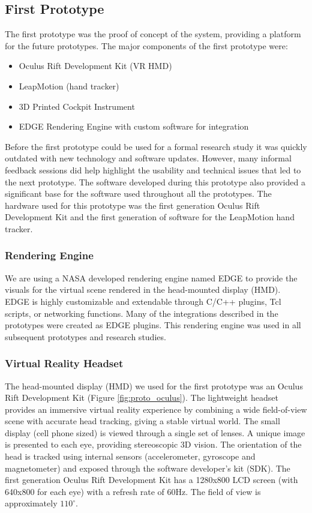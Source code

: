 \subsection{First Prototype}

The first prototype was the proof of concept of the system, providing a platform for the future prototypes.
The major components of the first prototype were:
\begin{itemize}
    \item Oculus Rift Development Kit (VR HMD)
    \item LeapMotion (hand tracker)
    \item 3D Printed Cockpit Instrument
    \item EDGE Rendering Engine with custom software for integration
\end{itemize}

Before the first prototype could be used for a formal research study it was quickly outdated with new technology and software updates.
However, many informal feedback sessions did help highlight the usability and technical issues that led to the next prototype.
The software developed during this prototype also provided a significant base for the software used throughout all the prototypes.
The hardware used for this prototype was the first generation Oculus Rift Development Kit and the first generation of software for the LeapMotion hand tracker.

\subsubsection{Rendering Engine}

We are using a NASA developed rendering engine named EDGE to provide the visuals for the virtual scene rendered in the head-mounted display (HMD).
EDGE is highly customizable and extendable through C/C++ plugins, Tcl scripts, or networking functions.
Many of the integrations described in the prototypes were created as EDGE plugins.
This rendering engine was used in all subsequent prototypes and research studies.

\subsubsection{Virtual Reality Headset}

The head-mounted display (HMD) we used for the first prototype was an Oculus Rift Development Kit (Figure \ref{fig:proto_oculus}).
The lightweight headset provides an immersive virtual reality experience by combining a wide field-of-view scene with accurate head tracking, giving a stable virtual world.
The small display (cell phone sized) is viewed through a single set of lenses.
A unique image is presented to each eye, providing stereoscopic 3D vision.
The orientation of the head is tracked using internal sensors (accelerometer, gyroscope and magnetometer) and exposed through the software developer’s kit (SDK).
The first generation Oculus Rift Development Kit has a 1280x800 LCD screen (with 640x800 for each eye) with a refresh rate of 60Hz.
The field of view is approximately $110^{\circ}$.


